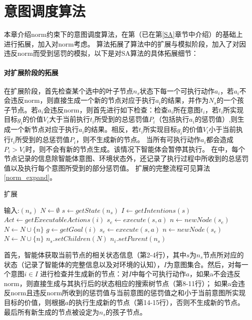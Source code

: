 \section{\SAN 意图调度算法}
本章介绍norm约束下的意图调度算法\SAN，\SAN 在第\SA （已在第\ref{SA}章节中介绍）的基础上进行拓展，加入对norm考虑。
\SAN 算法拓展了\SA 算法中的扩展与模拟阶段，加入了对因违反norm而受到惩罚的模拟，以下是对SA算法的具体拓展细节：
\paragraph{对扩展阶段的拓展}
在扩展阶段，\SAN 首先检查某个选中的叶子节点$n_s$状态下每一个可执行动作$a_i$，若$a_i$不会违反norm，则直接生成一个新的节点对应于执行$a_i$的结果，并作为$N_s$的一个孩子节点。若$a_i$会违反norm，则首先进行如下检查：检查$a_i$所在意图$t_i$，若$t_i$所实现目标$g_i$的价值$V_i$大于当前执行$t_i$所受到的总惩罚值$P_i$（包括执行$a_i$的惩罚值）,则生成一个新节点对应于执行$a_i$的结果。相反，若$t_i$所实现目标$g_i$的价值$V_i$小于当前执行$t_i$所受到的总惩罚值$P_i$，则不生成新的节点。
%
当所有可执行动作$a_i$都会造成$P_i > V_i$时，则不会有新的节点生成。该情况下智能体会暂停其执行。
在\SAN 中，每个节点记录的信息除智能体意图、环境状态外，还记录了执行过程中所收到的总惩罚值以及执行每个意图所受到的部分惩罚值。
扩展的完整流程可见算法\ref{norm_expand}。

\begin{algorithm}
\caption{扩展}\label{norm_expand}
\begin{algorithmic}[1]
\STATE 输入:$(n_s)$
      \STATE $N \gets \emptyset$
      \STATE $s \gets getState(n_s)$
      \STATE $I \gets getIntentions(s)$
        \STATE $Act \gets getExecutableActions(i)$
            \STATE $s_e \gets execute(s, a)$
            \STATE $n \gets newNode(s_e)$
            \STATE $N \gets N \cup \{n\}$
            \STATE $g \gets getGoal(i)$
            \STATE $s_e \gets execute(s, a)$
            \STATE $n \gets newNode(s_e)$
            \STATE $N \gets N \cup \{n\}$
          \ENDIF
        \ENDFOR
      \ENDFOR
    \STATE $n_s.setChildren(N)$
    \STATE $n_i.setParent(n_s)$
    \ENDFOR
\end{algorithmic}
\end{algorithm}
%
首先，智能体获取当前节点的相关状态信息（第2-4行），其中$s$为$n_s$节点所对应的状态（记录了智能体的完整信息以及对环境的认知），$I$为意图集合。然后，对每一个意图$i \in  I$ 进行检查并生成新的节点：对$I$中每个可执行动作$a$，如果a不会违反norm，则直接生成与其执行后的状态相应的搜索树节点（第8-11行）； 如果a会违反norm且违反norm所收到的惩罚值与当前意图的惩罚值之和小于当前意图所实现目标的价值，则根据$a$的执行生成新的节点（第14-15行），否则不生成新的节点。 最后所有新生成的节点被设定为$n_s$的孩子节点。

